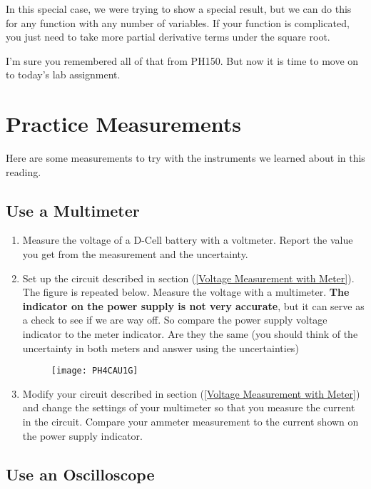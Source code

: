 In this special case, we were trying to show a special result, but we can do this for any function with any number of variables. If your function is complicated, you just need to take more partial derivative terms under the square root.

I'm sure you remembered all of that from PH150. But now it is time to move on to today's lab assignment.
\vfill
\pagebreak
\section{Practice Measurements}
Here are some measurements to try with the instruments we learned about in this reading.

\subsection{Use a Multimeter}

\begin{enumerate}
\item Measure the voltage of a D-Cell battery with a voltmeter. Report the value you get from the measurement and the uncertainty.

\item Set up the circuit described in section (\ref{Voltage Measurement with Meter}). The figure is repeated below. Measure the voltage with a multimeter. \textbf{The indicator on the power supply is not very accurate}, but it can serve as a check to see if we are way off. So compare the power
supply voltage indicator to the meter indicator. Are they the same (you should think of the uncertainty in both meters and answer using the uncertainties)

\begin{figure}[h!]
	\centering
    \texttt{[image: PH4CAU1G]}  
\end{figure}

\item Modify your circuit described in section (\ref{Voltage Measurement with Meter}) and change the settings of your multimeter so that you measure the current in the circuit. Compare your ammeter measurement to the current shown on the power supply indicator.
\end{enumerate}

\subsection{Use an Oscilloscope}

